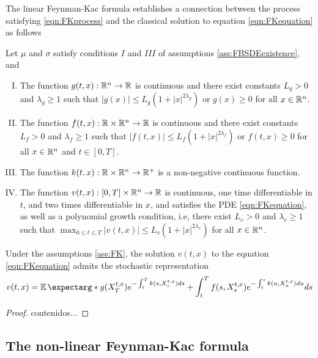 The linear Feynman-Kac formula establishes a connection between the process satisfying \eqref{eqn:FKprocess} and the classical solution to equation \eqref{eqn:FKequation} as follows
\begin{assumptions}
	\label{ass:FK}
	Let $\mu$ and $\sigma$ satisfy conditions $I$ and $III$ of assumptions \ref{ass:FBSDEexistence}, and 
	\begin{enumerate}[I.]
		\item The function $g(t,x):\mathbb{R}^n\to \mathbb{R}$ is continuous and there exist constants $L_g>0$ and $\lambda_g\geq 1$ such that $|g(x)|\leq L_g(1+|x|^{2\lambda_g})$ or $g(x)\geq 0$ for all $x\in \mathbb{R}^n$.
		\item The function $f(t,x):\mathbb{R}\times\mathbb{R}^n\to \mathbb{R}$ is continuous and there exist constants $L_f>0$ and $\lambda_f\geq 1$ such that $|f(t,x)|\leq L_f(1+|x|^{2\lambda_f})$ or $f(t,x)\geq 0$ for all $x\in \mathbb{R}^n$ and $t\in [0,T]$. 
		\item The function $k(t,x):\mathbb{R}\times \mathbb{R}^{n}\to \mathbb{R}^{+}$ is a non-negative continuous function.
		\item The function $v(t,x):[0,T]\times \mathbb{R}^n\to \mathbb{R}$ is continuous, one time differentiable in $t$, and two times differentiable in $x$, and satisfies the PDE \eqref{eqn:FKequation}, as well as a polynomial growth condition, i.e, there exist $L_v>0$ and $\lambda_v\geq 1$ such that  $\max_{0\leq t\leq T}|v(t,x)|\leq L_v(1+|x|^{2\lambda_v})$ for all $x\in\mathbb{R}^n$.
	\end{enumerate}
\end{assumptions}
\begin{theorem}
	Under the assumptions \ref{ass:FK}, the solution $v(t,x)$ to the equation \eqref{eqn:FKequation} admits the stochastic representation 
	\begin{equation}
		v(t,x)=\expect*{g(X_{T}^{t,x})e^{-\int_{t}^{T}k(s,X_{s}^{t,x})ds}+\int_{t}^{T}f(s,X_{s}^{t,x})e^{-\int_{t}^{s}k(u,X_{u}^{t,x})du}ds}
	\end{equation}
\end{theorem}
\begin{proof}
	contenidos...
\end{proof}
\subsection{The non-linear Feynman-Kac formula}

 


